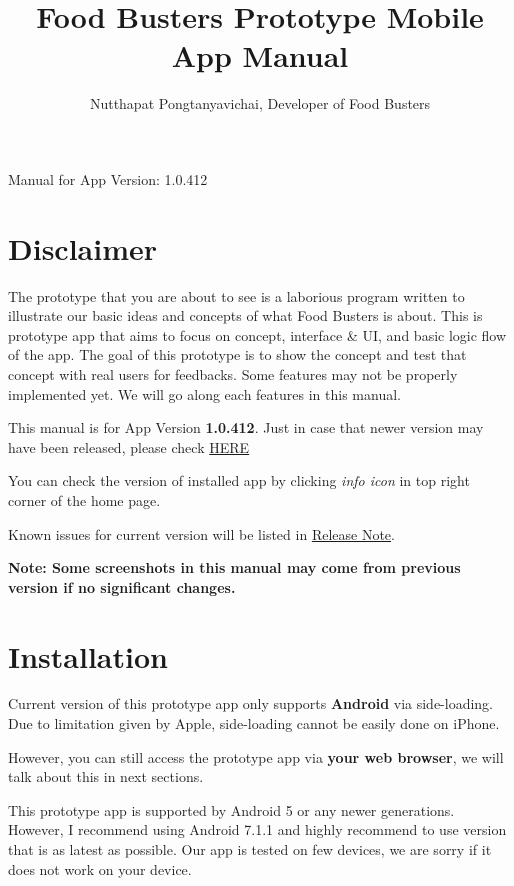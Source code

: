 \documentclass[a4paper,12pt]{article}
\begin{document}
\title{\textbf{Food Busters Prototype Mobile App Manual}}
\author{Nutthapat Pongtanyavichai, Developer of Food Busters}

\maketitle
\centerline{\LARGE{Manual for App Version: 1.0.412}}

\tableofcontents

\pagebreak
\section{Disclaimer}

The prototype that you are about to see is a laborious program written to
illustrate our basic ideas and concepts of what Food Busters is about.
This is prototype app that aims to focus on concept, interface \& UI,
and basic logic flow of the app. The goal of this prototype is to show the concept
and test that concept with real users for feedbacks.
Some features may not be properly implemented yet.
We will go along each features in this manual.

This manual is for App Version \textbf{1.0.412}.
Just in case that newer version may have been released,
please check \href{https://github.com/Food-Busters/food_busters/releases}{HERE}

You can check the version of installed app by clicking \textit{info icon}
in top right corner of the home page.

Known issues for current version will be listed in
\href{https://github.com/Food-Busters/food_busters/releases/tag/1.0.412}{Release Note}.

\textbf{Note: Some screenshots in this manual may come from previous version
if no significant changes.}

\section{Installation}

Current version of this prototype app only supports \textbf{Android} via side-loading.
Due to limitation given by Apple, side-loading cannot be easily done on iPhone.

However, you can still access the prototype app via \textbf{your web browser},
we will talk about this in next sections.

This prototype app is supported by Android 5 or any newer generations.
However, I recommend using Android 7.1.1 and highly recommend to use version
that is as latest as possible.
Our app is tested on few devices, we are sorry if it does not work on your device.
\end{document}

